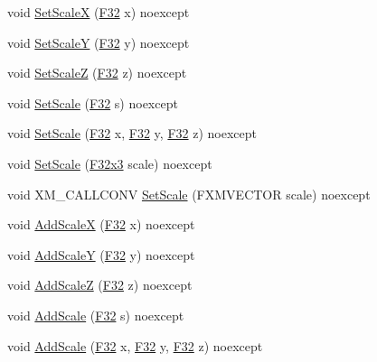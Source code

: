 \begin{DoxyCompactItemize}
\item 
void \hyperlink{classmage_1_1_transform_node_aba40e52810cbc4ef0db933ce771b1fac}{Set\+ScaleX} (\hyperlink{namespacemage_aa97e833b45f06d60a0a9c4fc22ae02c0}{F32} x) noexcept
\item 
void \hyperlink{classmage_1_1_transform_node_a8292656dfac20ee5e8b9c3e302b1fa6a}{Set\+ScaleY} (\hyperlink{namespacemage_aa97e833b45f06d60a0a9c4fc22ae02c0}{F32} y) noexcept
\item 
void \hyperlink{classmage_1_1_transform_node_a39587e5bfaffdaef7800addc6748062f}{Set\+ScaleZ} (\hyperlink{namespacemage_aa97e833b45f06d60a0a9c4fc22ae02c0}{F32} z) noexcept
\item 
void \hyperlink{classmage_1_1_transform_node_ab0d7ee104cc1815ce89b09fac56e9a1d}{Set\+Scale} (\hyperlink{namespacemage_aa97e833b45f06d60a0a9c4fc22ae02c0}{F32} s) noexcept
\item 
void \hyperlink{classmage_1_1_transform_node_a66336ad1e8afafafca4f4b78f874bad9}{Set\+Scale} (\hyperlink{namespacemage_aa97e833b45f06d60a0a9c4fc22ae02c0}{F32} x, \hyperlink{namespacemage_aa97e833b45f06d60a0a9c4fc22ae02c0}{F32} y, \hyperlink{namespacemage_aa97e833b45f06d60a0a9c4fc22ae02c0}{F32} z) noexcept
\item 
void \hyperlink{classmage_1_1_transform_node_afb0c941caff0cb213f755cb14f33e254}{Set\+Scale} (\hyperlink{namespacemage_a73fbe0da4b8d5bc156bb8453e5b63a17}{F32x3} scale) noexcept
\item 
void X\+M\+\_\+\+C\+A\+L\+L\+C\+O\+NV \hyperlink{classmage_1_1_transform_node_ad90daae6725ce76c43429ef5ab90c2da}{Set\+Scale} (F\+X\+M\+V\+E\+C\+T\+OR scale) noexcept
\item 
void \hyperlink{classmage_1_1_transform_node_acdf6f3a092fa47d428f3f4e9215160d9}{Add\+ScaleX} (\hyperlink{namespacemage_aa97e833b45f06d60a0a9c4fc22ae02c0}{F32} x) noexcept
\item 
void \hyperlink{classmage_1_1_transform_node_ab41eee8e27e8f155c7de643841953b45}{Add\+ScaleY} (\hyperlink{namespacemage_aa97e833b45f06d60a0a9c4fc22ae02c0}{F32} y) noexcept
\item 
void \hyperlink{classmage_1_1_transform_node_ae4550e69f9197e400ec21a3665cb5e34}{Add\+ScaleZ} (\hyperlink{namespacemage_aa97e833b45f06d60a0a9c4fc22ae02c0}{F32} z) noexcept
\item 
void \hyperlink{classmage_1_1_transform_node_ac45f837c9dc6e8cd143a72337b69893e}{Add\+Scale} (\hyperlink{namespacemage_aa97e833b45f06d60a0a9c4fc22ae02c0}{F32} s) noexcept
\item 
void \hyperlink{classmage_1_1_transform_node_af50ac0e9e6d7f6d610e9e399ebf05716}{Add\+Scale} (\hyperlink{namespacemage_aa97e833b45f06d60a0a9c4fc22ae02c0}{F32} x, \hyperlink{namespacemage_aa97e833b45f06d60a0a9c4fc22ae02c0}{F32} y, \hyperlink{namespacemage_aa97e833b45f06d60a0a9c4fc22ae02c0}{F32} z) noexcept

\end{DoxyCompactItemize}

